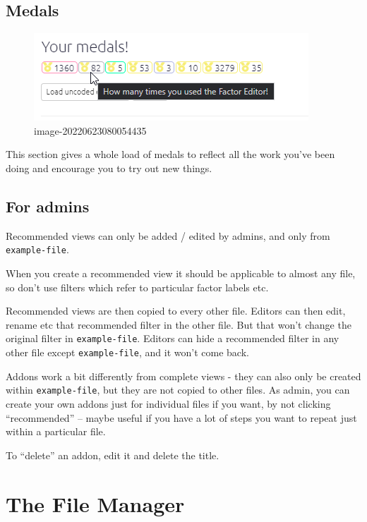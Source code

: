 \documentclass[
]{book}
\begin{document}
\hypertarget{medals}{%
\section{Medals}\label{medals}}

\begin{figure}
\centering
\includegraphics{_assets/image-20220623080054435.png}
\caption{image-20220623080054435}
\end{figure}

This section gives a whole load of medals to reflect all the work you've been doing and encourage you to try out new things.

\hypertarget{for-admins}{%
\section{For admins}\label{for-admins}}

Recommended views can only be added / edited by admins, and only from \texttt{example-file}.

When you create a recommended view it should be applicable to almost any file, so don't use filters which refer to particular factor labels etc.

Recommended views are then copied to every other file. Editors can then edit, rename etc that recommended filter in the other file. But that won't change the original filter in \texttt{example-file}. Editors can hide a recommended filter in any other file except \texttt{example-file}, and it won't come back.

Addons work a bit differently from complete views - they can also only be created within \texttt{example-file}, but they are not copied to other files. As admin, you can create your own addons just for individual files if you want, by not clicking ``recommended'' -- maybe useful if you have a lot of steps you want to repeat just within a particular file.

To ``delete'' an addon, edit it and delete the title.

\hypertarget{xfile-manager}{%
\chapter{The File Manager}\label{xfile-manager}}
\end{document}
